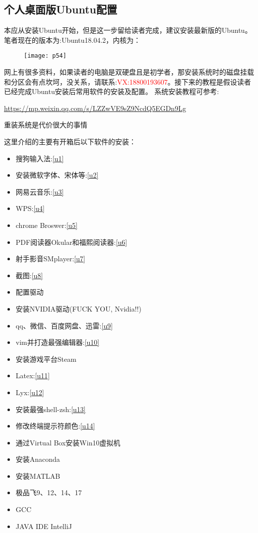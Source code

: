 \documentclass[utf8]{book}
\begin{document}
\begin{appendices}
	\renewcommand{\thechapter}{\Alph{chapter}.}
	\chapter{个人桌面版Ubuntu配置}\label{append1}
		本应从安装Ubuntu开始，但是这一步留给读者完成，建议安装最新版的Ubuntu。笔者现在的版本为:Ubuntu18.04.2，内核为：
	
	\begin{figure}[H]
		\centering
		\texttt{[image: p54]}
	\end{figure}
	网上有很多资料，如果读者的电脑是双硬盘且是初学者，那安装系统时的磁盘挂载和分区会有点坎坷，没关系，请联系:\textcolor{red}{VX:18800193607}。接下来的教程是假设读者已经完成Ubuntu安装后常用软件的安装及配置。
	系统安装教程可参考:
	
	\url{https://mp.weixin.qq.com/s/LZZwVE9sZ9NcdQ5EGDn9Lg}
	
	{\Large 重装系统是代价很大的事情}
	
	这里介绍的主要有开箱后以下软件的安装：
	\begin{itemize}
		\item 搜狗输入法:\ref{u1}
		\item 安装微软字体、宋体等:\ref{u2}
		\item 网易云音乐:\ref{u3}
		\item WPS:\ref{u4}
		\item chrome Broswer:\ref{u5}
		\item PDF阅读器Okular和福熙阅读器:\ref{u6}
		\item 射手影音SMplayer:\ref{u7}
		\item 截图:\ref{u8}
		\item 配置驱动
		\item 安装NVIDIA驱动(FUCK YOU, Nvidia!!)
		\item qq、微信、百度网盘、迅雷:\ref{u9}
		\item vim并打造最强编辑器:\ref{u10}
		\item 安装游戏平台Steam
		\item Latex:\ref{u11}
		\item Lyx:\ref{u12}
		\item 安装最强shell-zsh:\ref{u13}
		\item 修改终端提示符颜色:\ref{u14}
		\item 通过Virtual Box安装Win10虚拟机
		\item 安装Anaconda
		\item 安装MATLAB
		\item 极品飞9、12、14、17
		\item GCC
		\item JAVA IDE IntelliJ
	\end{itemize}


\end{appendices}
\end{document}
